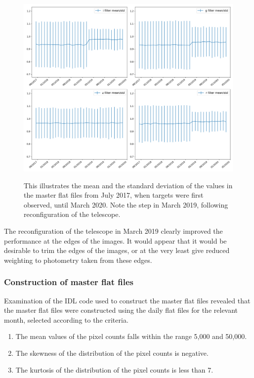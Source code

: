 \begin{figure}[!htbp]
\begin{center}
\includegraphics[scale=0.4]{images/mastmean.png}
\end{center}   
\caption{This illustrates the mean and the standard deviation of the values in
the master flat files from July 2017, when {\rdwarf} targets were first
observed, until March 2020. Note the step in March 2019, following
reconfiguration of the telescope.}
\protect\label{fig:mastmean}
\end{figure}

The reconfiguration of the telescope in March 2019 clearly improved the
performance at the edges of the images. It would appear that it would be
desirable to trim the edges of the images, or at the very least give reduced
weighting to photometry taken from these edges.

\subsubsection{Construction of master flat files}
\protect\label{section:constructmff}

Examination of the IDL code used to construct the master flat files revealed
that the master flat files were constructed using the daily flat files for the
relevant month, selected according to the criteria.

\begin{enumerate}
  \item The mean values of the pixel counts falls within the range 5,000 and
  50,000.
  \item The skewness of the distribution of the pixel counts is negative.
  \item The kurtosis of the distribution of the pixel counts is less than 7.
\end{enumerate}

